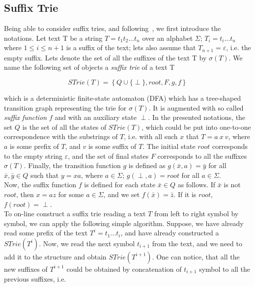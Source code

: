 \documentclass[paper=a4, fontsize=11pt]{scrartcl} %
\numberwithin{equation}{section} %
\numberwithin{figure}{section} %
\numberwithin{table}{section} %
\begin{document}
\subsection{Suffix Trie}
Being able to consider suffix tries, and following~\cite{ukkonen1995online}, we first introduce the notations. Let text T be a string $T = t_1 t_2 \dots t_n$ over an alphabet $\Sigma$; $T_i = t_i \dots t_n$ where $1 \leq i \leq n+1$ is a suffix of the text; lets also assume that $T_{n+1} = \varepsilon$, i.e. the empty suffix. Lets denote the set of all the suffixes of the text T by $\sigma(T)$. We name the following set of objects a \textit{suffix trie} of a text T

\begin{equation}
STrie(T) = \left\{Q \cup \{\perp\}, root, F, g, f \right\}
\end{equation}

which is a deterministic finite-state automaton (DFA) which has a tree-shaped transition graph representing the trie for $\sigma(T)$. It is augmented with so called \textit{suffix function} $f$ and with an auxiliary state $\perp$. In the presented notations, the set $Q$ is the set of all the states of $STrie(T)$, which could be put into one-to-one correspondence with the substrings of $T$, i.e. with all such $x$ that $T = a\ x\ v$, where $a$ is some prefix of $T$, and $v$ is some suffix of $T$. The initial state $root$ corresponds to the empty string $\varepsilon$, and the set of final states $F$ corresponds to all the suffixes $\sigma(T)$. Finally, the transition function $g$ is defined as $g(\bar{x}, a) = \bar{y}$ for all $\bar{x}, \bar{y} \in Q$ such that $y = xa$, where $a \in \Sigma$; $g(\perp, a) = root$ for all $a \in \Sigma$.\\

Now, the suffix function $f$ is defined for each state $\bar{x} \in Q$ as follows. If $\bar{x}$ is not $root$, then $x = az$ for some $a \in \Sigma$, and we set $f(\bar{x}) = \bar{z}$. If it is $root$, $f(root) = \perp$.\\

To on-line construct a suffix trie reading a text $T$ from left to right symbol by symbol, we can apply the following simple algorithm. Suppose, we have already read some prefix of the text $T^i = t_1 \dots t_i$, and have already constructed a $STrie(T^i)$. Now, we read the next symbol $t_{i+1}$ from the text, and we need to add it to the structure and obtain $STrie(T^{i+1})$. One can notice, that all the new suffixes of $T^{i+1}$ could be obtained by concatenation of $t_{i+1}$ symbol to all the previous suffixes, i.e.
\end{document}
